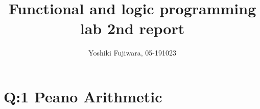 \documentclass[uplatex,12pt]{jsarticle}
\title {Functional and logic programming lab 2nd report}
\date{}
\begin{document}
\author{Yoshiki Fujiwara, 05-191023}
\maketitle
\section{Q:1 Peano Arithmetic}
\end{document}
